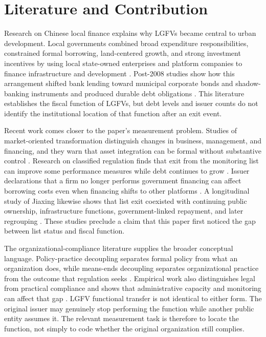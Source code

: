 \section{Literature and Contribution}

Research on Chinese local finance explains why LGFVs became central to urban
development. Local governments combined broad expenditure responsibilities,
constrained formal borrowing, land-centered growth, and strong investment
incentives by using local state-owned enterprises and platform companies to
finance infrastructure and development \citep{montinola1995,jin2005,oi1992,
oi1995,wong2013,tsui2011}. Post-2008 studies show how this arrangement shifted
bank lending toward municipal corporate bonds and shadow-banking instruments
and produced durable debt obligations \citep{bai2016longshadow,
chen_he_liu_2020_financing,liu_oi_zhang_2022_grand_bargain}. This literature
establishes the fiscal function of LGFVs, but debt levels and issuer counts do
not identify the institutional location of that function after an exit event.

Recent work comes closer to the paper's measurement problem. Studies of
market-oriented transformation distinguish changes in business, management,
and financing, and they warn that asset integration can be formal without
substantive control \citep{li_feng_hao_2022_lgfp_transformation}. Research on
classified regulation finds that exit from the monitoring list can improve
some performance measures while debt continues to grow
\citep{fang_lu_2024_classified_regulation}. Issuer declarations that a firm no
longer performs government financing can affect borrowing costs even when
financing shifts to other platforms \citep{li_he_ai_2025_transformation}. A
longitudinal study of Jiaxing likewise shows that list exit coexisted with
continuing public ownership, infrastructure functions, government-linked
repayment, and later regrouping \citep{feng_wu_zhang_2022_jiaxing}. These
studies preclude a claim that this paper first noticed the gap between list
status and fiscal function.

The organizational-compliance literature supplies the broader conceptual
language. Policy-practice decoupling separates formal policy from what an
organization does, while means-ends decoupling separates organizational
practice from the outcome that regulation seeks
\citep{bromley_powell_2012_decoupling,de_bree_stoopendaal_2020_recoupling}.
Empirical work also distinguishes legal from practical compliance and shows
that administrative capacity and monitoring can affect that gap
\citep{short_toffel_2010_self_regulation,
zhelyazkova_kaya_schrama_2016_compliance}. LGFV functional transfer is not
identical to either form. The original issuer may genuinely stop performing the
function while another public entity assumes it. The relevant measurement task
is therefore to locate the function, not simply to code whether the original
organization still complies.

